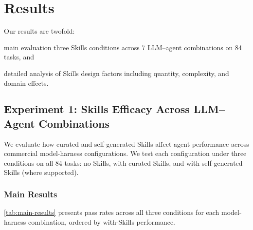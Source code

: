 \section{Results}
\label{sec:results}

Our results are twofold:
\begin{enumerate*}
\item main evaluation three Skills conditions across 7 LLM--agent combinations on 84 tasks, and
\item detailed analysis of Skills design factors including quantity, complexity, and domain effects.
\end{enumerate*}
\subsection{Experiment 1: Skills Efficacy Across LLM--Agent Combinations}

We evaluate how curated and self-generated Skills affect agent performance across commercial model-harness configurations.
We test each configuration under three conditions on all 84 tasks: no Skills, with curated Skills, and with self-generated Skills (where supported).

\subsubsection{Main Results}

\autoref{tab:main-results} presents pass rates across all three conditions for each model-harness combination, ordered by with-Skills performance.


